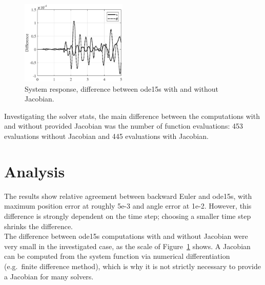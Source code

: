 \documentclass{article}
\begin{document}
	\begin{figure}[h!]
		\centering
		\includegraphics[width=0.45\textwidth]{diff_jac.eps}
		\caption{System response, difference between ode15s with and without Jacobian.\label{fig:jacobian}}
	\end{figure}

	Investigating the solver stats, the main difference between the computations with and without provided Jacobian was the number of function evaluations: 453 evaluations without Jacobian and 445 evaluations with Jacobian.
	
	\section*{Analysis}
	The results show relative agreement between backward Euler and ode15s, with maximum position error at roughly 5e-3 and angle error at 1e-2. However, this difference is strongly dependent on the time step; choosing a smaller time step shrinks the difference.\\
	
	The difference between ode15s computations with and without Jacobian were very small in the investigated case, as the scale of Figure~\ref{fig:jacobian} shows. A Jacobian can be computed from the system function via numerical differentiation (e.g.~finite difference method), which is why it is not strictly necessary to provide a Jacobian for many solvers.
\end{document}

